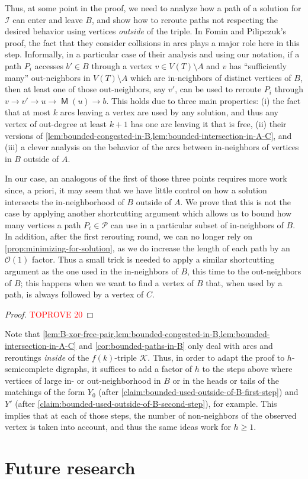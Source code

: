 \documentclass[a4paper,UKenglish,cleveref, autoref, thm-restate]{lipics-v2021}
\DeclareMathOperator{\Mat}{\mathsf M}
\newcommand{\bigO}[1]{\mathcal{O}\!\left(#1\right)}
\begin{document}
Thus, at some point in the proof, we need to analyze how a path of a solution for $\mathcal{I}$ can enter and leave $B$, and show how to reroute paths not respecting the desired behavior using vertices \emph{outside} of the triple.
In Fomin and Pilipczuk's proof, the fact that they consider collisions in arcs plays  a major role here in this step.
Informally, in a particular case of their analysis and using our notation, if a path $P_i$ accesses $b' \in B$ through a vertex $v \in V(T) \setminus A$ and $v$ has ``sufficiently many'' out-neighbors in $V(T) \setminus A$ which are in-neighbors of distinct vertices of $B$, then at least one of those out-neighbors, say $v'$, can be used to reroute $P_i$ through $v \to v' \to u \to \Mat(u) \to b$.
This holds due to three main properties: (i) the fact that at most $k$ arcs leaving a vertex are used by any solution, and thus any vertex of out-degree at least $k+1$ has one arc leaving it that is free, (ii) their versions of \cref{lem:bounded-congested-in-B,lem:bounded-intersection-in-A-C}, and (iii) a clever analysis on the behavior of the arcs between in-neighbors of vertices in $B$ outside of $A$.

In our case, an analogous of the first of those three points requires more work since, a priori, it may seem that we have little control on how a solution intersects the in-neighborhood of $B$ outside of $A$.
We prove that this is not the case by applying another shortcutting argument which allows us to bound how many vertices a path $P_i \in \mathcal{P}$ can use in a particular subset of in-neighbors of $B$.
In addition, after the first rerouting round, we can no longer rely on  \autoref{prop:minimizing-for-solution}, as we do increase the length of each path by an $\bigO{1}$ factor.
Thus a small trick is needed to apply a similar shortcutting argument as the one used in the in-neighbors of $B$, this time to the out-neighbors of $B$; this happens when we want to find a vertex of $B$ that, when used by a path, is always followed by a vertex of $C$.

\begin{proof}\textcolor{red}{TOPROVE 20}\end{proof}

Note that \cref{lem:B-xor-free-pair,lem:bounded-congested-in-B,lem:bounded-intersection-in-A-C} and \autoref{cor:bounded-paths-in-B} only deal with arcs and reroutings {\sl inside} of the $f(k)$-triple $\mathcal{K}$.
Thus, in order to adapt the proof to $h$-semicomplete digraphs, it suffices to add a factor of $h$ to the steps above where vertices of large in- or out-neighborhood in $B$ or in the heads or tails of the matchings of the form $Y_0$ (after \autoref{claim:bounded-used-outside-of-B-first-step}) and $Y'$ (after \autoref{claim:bounded-used-outside-of-B-second-step}), for example.
This implies that at each of those steps, the number of non-neighbors of the observed vertex is taken into account, and thus the same ideas work for $h \geq 1$. \section{Future research}
\label{sec:conclusions}
\end{document}
